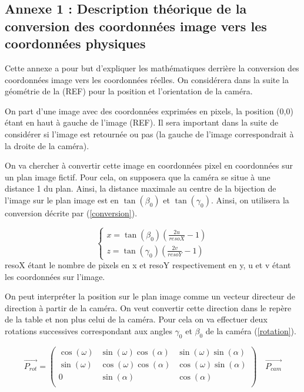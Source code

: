 \documentclass{article}
\begin{document}
\newpage
\renewcommand\appendixtocname{Annexes}
\renewcommand\appendixpagename{Annexes}
\begin{appendices}
\chapter{\LARGE{Annexe 1 : Description théorique de la conversion des coordonnées image vers les  coordonnées physiques}}
\newline\newline

Cette annexe a pour but d'expliquer les mathématiques derrière la conversion des coordonnées image vers les coordonnées réelles.
\newline
On considérera dans la suite la géométrie de la (REF) pour la position et l'orientation de la caméra.

On part d'une image avec des coordonnées exprimées en pixels, la position (0,0) étant en haut à gauche de l'image (REF). Il sera important dans la suite de considérer si l'image est retournée ou pas (la gauche de l'image correspondrait à la droite de la caméra).


On va chercher à convertir cette image en coordonnées pixel en coordonnées sur un plan image fictif. Pour cela, on supposera que la caméra se situe à une distance 1 du plan. Ainsi, la distance maximale au centre de la bijection de l'image sur le plan image est en $\tan(\beta_0)$ et $\tan(\gamma_0)$. Ainsi, on utilisera la conversion décrite par (\ref{conversion}).

\begin{equation}
\label{conversion}
\left\{
    \begin{array}{ll}
        x = \tan(\beta_0)(\frac{2u}{resoX}-1)\\
        z = \tan(\gamma_0)(\frac{2v}{resoY} -1)
    \end{array}
\right.
\end{equation}
resoX étant le nombre de pixels en x et resoY respectivement en y, u et v étant les coordonnées sur l'image.

On peut interpréter la position sur le plan image comme un vecteur directeur de direction à partir de la caméra. On veut convertir cette direction dans le repère de la table et non plus celui de la caméra. Pour cela on va effectuer deux rotations successives correspondant aux angles $\gamma_0$ et $\beta_0$ de la caméra (\ref{rotation}).

\begin{equation}
\label{rotation}
\vec{P_{rot}} =
\begin{pmatrix}
\cos(\omega) & \sin(\omega)\cos(\alpha) & \sin(\omega)\sin(\alpha) \\
\sin(\omega) & \cos(\omega)\cos(\alpha) & \cos(\omega)\sin(\alpha)\\
0 & \sin(\alpha) & \cos(\alpha)\\
\end{pmatrix}
\quad
\vec{P_{cam}}
\end{equation}


\end{appendices}
\end{document}
